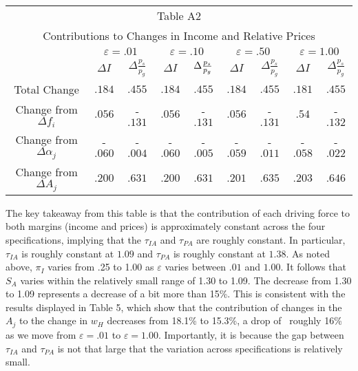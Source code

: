 \documentclass[12pt,english]{article}
\begin{document}
\begin{center}
\begin{tabular}{ccccccccc}
\multicolumn{9}{c}{Table A2} \\ 
\multicolumn{9}{c}{Contributions to Changes in Income and Relative Prices}
\\ \hline\hline
& \multicolumn{2}{c}{$\varepsilon =.01$} & \multicolumn{2}{c}{$\varepsilon
=.10$} & \multicolumn{2}{c}{$\varepsilon =.50$} & \multicolumn{2}{c}{$%
\varepsilon =1.00$} \\ \hline\hline
& $\Delta I$ & $\Delta \frac{p_{s}}{p_{g}}$ & $\Delta I$ & $\Delta \frac{%
p_{s}}{p_{g}}$ & $\Delta I$ & $\Delta \frac{p_{s}}{p_{g}}$ & $\Delta I$ & $%
\Delta \frac{p_{s}}{p_{g}}$ \\ 
{\small Total Change} & $.184$ & $.455$ & $.184$ & $.455$ & $.184$ & $.455$
& $.181$ & $.455$ \\ 
{\small Change from }$\Delta f_{i}$ & $.056$ & -$.131$ & $.056$ & -$.131$ & $%
.056$ & -$.131$ & $.54$ & -$.132$ \\ 
{\small Change from } $\Delta \alpha _{j}$ & -$.060$ & -$.004$ & -$.060$ & -$%
.005$ & -$.059$ & -$.011$ & -$.058$ & -$.022$ \\ 
{\small Change from }$\Delta A_{j}$ & $.200$ & $.631$ & $.200$ & $.631$ & $%
.201$ & $.635$ & $.203$ & $.646$ \\ \hline
\end{tabular}
\end{center}

The key takeaway from this table is that the contribution of each driving
force to both margins (income and prices) is approximately constant across
the four specifications, implying that the $\tau _{IA}$ and $\tau _{PA}$  are roughly
constant. In particular, $\tau _{IA}$ is roughly constant at $1.09$ and $%
\tau _{PA}$ is roughly constant at $1.38$. As noted above, $\pi _{I}$ varies
from .25 to 1.00 as $\varepsilon $ varies between $.01$ and $1.00$. It
follows that $S_{A}$ varies within the relatively small range of 1.30 to
1.09. The decrease from 1.30 to 1.09 represents a decrease of a bit more than 15\%. This is consistent with the results displayed in Table 5, which
show that the contribution of changes in the $A_{j}$ to the change in $w_{H}$
decreases from 18.1\% to 15.3\%, a drop of \ roughly 16\% as we move from $%
\varepsilon =.01$ to $\varepsilon =1.00$. Importantly, it is because the gap
between $\tau _{IA}$ and $\tau _{PA}$ is not that large that the variation
across specifications is relatively small.
\end{document}
